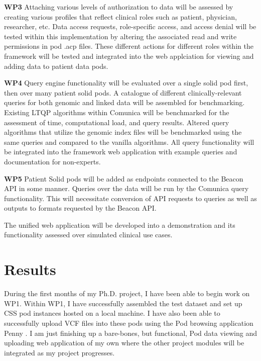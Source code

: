 \documentclass[runningheads]{llncs}
\begin{document}
\textbf{WP3}
Attaching various levels of authorization to data will be assessed by creating various profiles that reflect clinical roles such as patient, physician, researcher, etc. 
Data access requests, role-specific access, and access denial will be tested within this implementation by altering the associated read and write permissions in pod .acp files.
These different actions for different roles within the framework will be tested and integrated into the web applciation for viewing and adding data to patient data pods. 

\textbf{WP4}
Query engine functionality will be evaluated over a single solid pod first, then over many patient solid pods. 
A catalogue of different clinically-relevant queries for both genomic and linked data will be assembled for benchmarking.
Existing LTQP algorithms within Comunica will be benchmarked for the assessment of time, computational load, and query results.
Altered query algorithms that utilize the genomic index files will be benchmarked using the same queries and compared to the vanilla algorithms.
All query functionality will be integrated into the framework web application with example queries and documentation for non-experts.

\textbf{WP5}
Patient Solid pods will be added as endpoints connected to the Beacon API in some manner. 
Queries over the data will be run by the Comunica query functionality.
This will necessitate conversion of API requests to queries as well as outputs to formats requested by the Beacon API.

The unified web application will be developed into a demonstration and its functionality assessed over simulated clinical use cases.


\section{Results}

During the first months of my Ph.D. project, I have been able to begin work on WP1. 
Within WP1, I have successfully assembled the test dataset and set up CSS pod instances hosted on a local machine.
I have also been able to successfully upload VCF files into these pods using the Pod browsing application Penny \cite{penny}. 
I am just finishing up a bare-bones, but functional, Pod data viewing and uploading web application of my own where the other project modules will be integrated as my project progresses.
\end{document}
